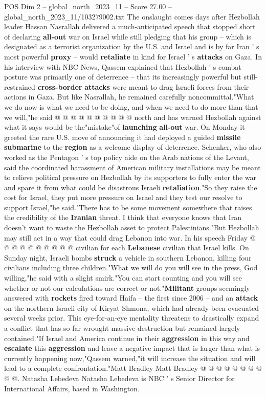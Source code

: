 \begin{textsample}{POS Dim 2 – global\_north\_2023\_11 – Score 27.00 – global\_north\_2023\_11/103279002.txt}
The onslaught comes days after Hezbollah leader Hassan Nasrallah delivered a much-anticipated speech that stopped short of declaring \textbf{all-out} war on Israel while still pledging that his group -- which is designated as a terrorist organization by the U.S. and Israel and is by far Iran ' s most powerful \textbf{proxy} -- would \textbf{retaliate} in kind for Israel ' s \textbf{attacks} on Gaza.
In his interview with NBC News, Qassem explained that Hezbollah ' s combat posture was primarily one of deterrence -- that its increasingly powerful but still-restrained \textbf{cross-border} \textbf{attacks} were meant to drag Israeli forces from their actions in Gaza.
But like Nasrallah, he remained carefully noncommittal."What we do now is what we need to be doing, and when we need to do more than that we will,"he said @ @ @ @ @ @ @ @ @ @ north and has warned Hezbollah against what it says would be the"mistake"of \textbf{launching} \textbf{all-out} war.
On Monday it greeted the rare U.S. move of announcing it had deployed a guided \textbf{missile} \textbf{submarine} to the \textbf{region} as a welcome display of deterrence.
Schenker, who also worked as the Pentagon ' s top policy aide on the Arab nations of the Levant, said the coordinated harassment of American military installations may be meant to relieve political pressure on Hezbollah by its supporters to fully enter the war and spare it from what could be disastrous Israeli \textbf{retaliation}."So they raise the cost for Israel, they put more pressure on Israel and they test our resolve to support Israel,"he said."There has to be some movement somewhere that raises the credibility of the \textbf{Iranian} threat.
I think that everyone knows that Iran doesn't want to waste the Hezbollah asset to protect Palestinians."But Hezbollah may still act in a way that could drag Lebanon into war.
In his speech Friday @ @ @ @ @ @ @ @ @ @ civilian for each \textbf{Lebanese} civilian that Israel kills.
On Sunday night, Israeli bombs \textbf{struck} a vehicle in southern Lebanon, killing four civilians including three children."What we will do you will see in the press, God willing,"he said with a slight smirk."You can start counting and you will see whether or not our calculations are correct or not."\textbf{Militant} groups seemingly answered with \textbf{rockets} fired toward Haifa -- the first since 2006 -- and an \textbf{attack} on the northern Israeli city of Kiryat Shmona, which had already been evacuated several weeks prior.
This eye-for-an-eye mentality threatens to drastically expand a conflict that has so far wrought massive destruction but remained largely contained."If Israel and America continue in their \textbf{aggression} in this way and \textbf{escalate} this \textbf{aggression} and leave a negative impact that is larger than what is currently happening now,"Qassem warned,"it will increase the situation and will lead to a complete confrontation."Matt Bradley Matt Bradley @ @ @ @ @ @ @ @ @ @.
Natasha Lebedeva Natasha Lebedeva is NBC ' s Senior Director for International Affairs, based in Washington.


\end{textsample}
